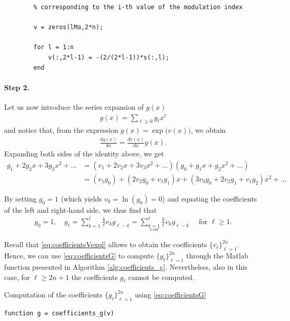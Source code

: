 \documentclass[a4paper]{article}
\numberwithin{equation}{section}
\begin{document}
{\begin{algorithm}
\begin{lstlisting}[style=Matlab-editor, basicstyle=\mlttfamily\footnotesize]
		% The i-th row of the matrix v contains the 2n coefficients v_i
		% corresponding to the i-th value of the modulation index
		
		v = zeros(lMa,2*n);
		
		for l = 1:n
			v(:,2*l-1) = -(2/(2*l-1))*s(:,l);
		end
	\end{lstlisting}
\end{algorithm}

\paragraph{Step 2.} Let us now introduce the series expansion of $g(x)$
\begin{align*}
	g(x) = \sum_{\ell\geq 0} g_\ell x^\ell 
\end{align*} 
and notice that, from the expression $g(x) = \exp\big(v(x)\big)$, we obtain
\begin{align*}
	\frac{dg(x)}{dx} = \frac{dv(x)}{dx}g(x).
\end{align*}
Expanding both sides of the identity above, we get
\begin{align*}
	g_1 + 2g_2x + 3g_3x^2 + \ldots &= (v_1 + 2v_2x + 3v_3x^2 + \ldots)(g_0 + g_1x + g_2x^2 + \ldots)
	\\
	&= (v_1g_0) + (2v_2g_0 + v_1g_1)x + (3v_3g_0 + 2v_2g_1 + v_1g_2)x^2 + \ldots 
\end{align*}

By setting $g_0=1$ (which yields $v_0 = \ln(g_0) =0$) and equating the coefficients of the left and right-hand side, we thus find that
\begin{align}\label{eq:coefficientsG}
	g_0 = 1, \quad g_\ell = \sum_{k=1}^\ell \frac k\ell v_kg_{\ell-k} = \sum_{\underset{k\; odd}{k=1}}^\ell \frac k\ell v_kg_{\ell-k} \quad\mbox{ for } \ell\geq 1. 
\end{align}

Recall that \eqref{eq:coefficientsVexpl} allows to obtain the coefficients $\{v_\ell\}_{\ell=1}^{2n}$. Hence, we can use \eqref{eq:coefficientsG} to compute $\{g_\ell\}_{\ell=1}^{2n}$ through the Matlab function presented in Algorithm \ref{alg:coefficients_g}. Nevertheless, also in this case, for $\ell\geq 2n+1$ the coefficients $g_\ell$ cannot be computed.

\begin{algorithm}
	\caption{Computation of the coefficients $\{g_\ell\}_{\ell=1}^{2n}$ using \eqref{eq:coefficientsG}} \label{alg:coefficients_g}
	\begin{lstlisting}[style=Matlab-editor, basicstyle=\mlttfamily\footnotesize]
		function g = coefficients_g(v)
		

\end{lstlisting}
\end{algorithm}}
\end{document}

